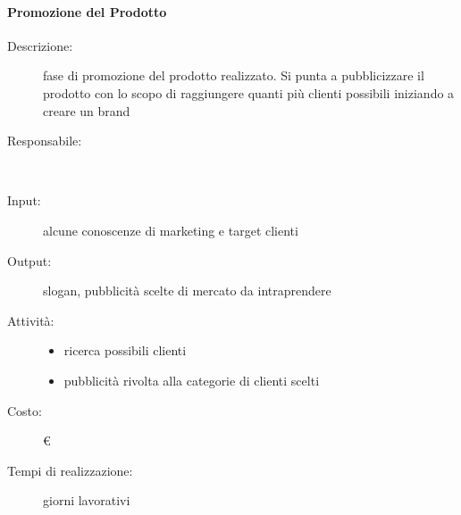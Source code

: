 \paragraph{Promozione del Prodotto}
\begin{description}
\item[Descrizione:] fase di promozione del prodotto realizzato. Si punta a pubblicizzare il
prodotto con lo scopo di raggiungere quanti più clienti possibili iniziando a creare un brand \\

\item[Responsabile:] \\

\item[Input:] alcune conoscenze di marketing e target clienti \\

\item[Output:] slogan, pubblicità scelte di mercato da intraprendere \\

\item[Attività:]
\begin{itemize}
\item ricerca possibili clienti
\item pubblicità rivolta alla categorie di clienti scelti
\end{itemize}
\item[Costo:] \euro \\
\item[Tempi di realizzazione:]  giorni lavorativi
\end{description}

